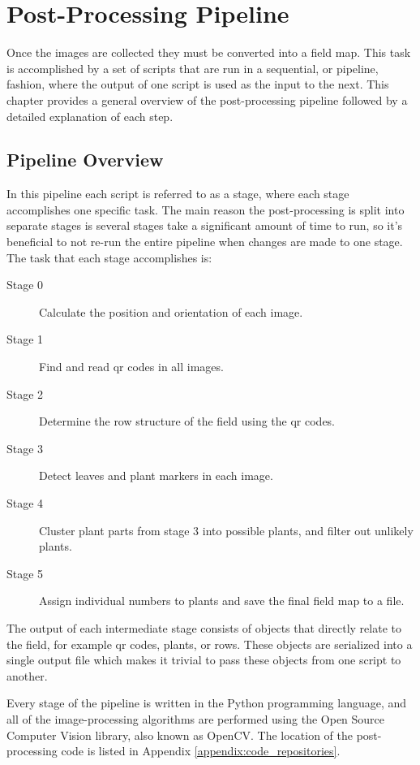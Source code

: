 
\cleardoublepage

\chapter{Post-Processing Pipeline}
\label{chapter:pipeline}

Once the images are collected they must be converted into a field map. This task is accomplished by a set of scripts that are run in a sequential, or pipeline, fashion, where the output of one script is used as the input to the next.  This chapter provides a general overview of the post-processing pipeline followed by a detailed explanation of each step.

\section{Pipeline Overview}
\label{processing-overview}

In this pipeline each script is referred to as a stage, where each stage accomplishes one specific task.  The main reason the post-processing is split into separate stages is several stages take a significant amount of time to run, so it's beneficial to not re-run the entire pipeline when changes are made to one stage.  The task that each stage accomplishes is:

\begin{description}
\item[Stage 0] Calculate the position and orientation of each image.
\item[Stage 1] Find and read \ac{qr} codes in all images.
\item[Stage 2] Determine the row structure of the field using the \ac{qr} codes.
\item[Stage 3] Detect leaves and plant markers in each image.
\item[Stage 4] Cluster plant parts from stage 3 into possible plants, and filter out unlikely plants.
\item[Stage 5] Assign individual numbers to plants and save the final field map to a file. 
\end{description}
 
The output of each intermediate stage consists of objects that directly relate to the field, for example \ac{qr} codes, plants, or rows.  These objects are serialized into a single output file which makes it trivial to pass these objects from one script to another. 

Every stage of the pipeline is written in the Python programming language, and all of the image-processing algorithms are performed using the Open Source Computer Vision library, also known as OpenCV.  The location of the post-processing code is listed in Appendix \ref{appendix:code_repositories}.

